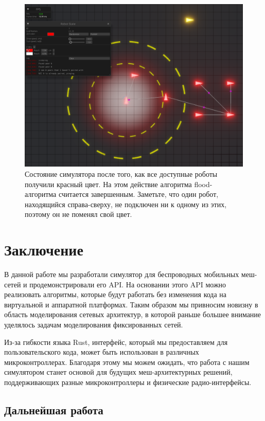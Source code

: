 \documentclass[%
]{report}
\begin{document}
\begin{figure}
  \includegraphics[width = \textwidth]{colors-4.png}
  \caption{Состояние симулятора после того, как все доступные роботы получили красный цвет. На этом действие алгоритма flood-алгоритма
  считается завершенным. Заметьте, что один робот,
  находящийся справа-сверху, не подключен ни к одному из этих, поэтому он не поменял свой цвет.}
\end{figure}


\chapter{Заключение}

В данной работе мы разработали симулятор для беспроводных мобильных меш-сетей
и продемонстрировали его API.
На основании этого API можно реализовать алгоритмы, которые будут
работать без изменения кода на виртуальной и аппаратной платформах.
Таким образом мы привносим новизну в область моделирования сетевых архитектур,
в которой раньше большее внимание уделялось задачам моделирования фиксированных сетей.

Из-за гибкости языка Rust,
интерфейс, который мы предоставляем для пользовательского кода,
может быть использован в различных микроконтроллерах.
Благодаря этому мы можем ожидать,
что работа с нашим симулятором станет основой
для будущих меш-архитектурных решений,
поддерживающих разные микроконтроллеры
и физические радио-интерфейсы.

\section{Дальнейшая работа}
\end{document}
